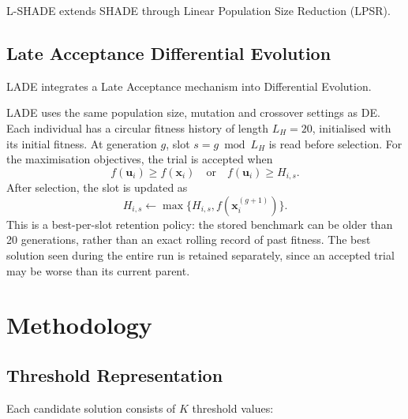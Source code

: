 \documentclass[review]{elsarticle}
\begin{document}
L-SHADE extends SHADE through Linear Population Size Reduction (LPSR).



\subsection{Late Acceptance Differential Evolution}

LADE integrates a Late Acceptance mechanism into Differential Evolution.

LADE uses the same population size, mutation and crossover settings as DE.
Each individual has a circular fitness history of length $L_H=20$,
initialised with its initial fitness. At generation $g$, slot
$s=g\bmod L_H$ is read before selection. For the maximisation objectives,
the trial is accepted when
\begin{equation}
f(\mathbf{u}_i)\geq f(\mathbf{x}_i)
\quad\text{or}\quad f(\mathbf{u}_i)\geq H_{i,s}.
\end{equation}
After selection, the slot is updated as
\begin{equation}
H_{i,s}\leftarrow\max\{H_{i,s},f(\mathbf{x}_i^{(g+1)})\}.
\end{equation}
This is a best-per-slot retention policy: the stored benchmark can be
older than 20 generations, rather than an exact rolling record of past
fitness. The best solution seen during the entire run is retained
separately, since an accepted trial may be worse than its current parent.

%





\section{Methodology}
\label{sec:methodology}


\subsection{Threshold Representation}

Each candidate solution consists of $K$ threshold values:
\end{document}
